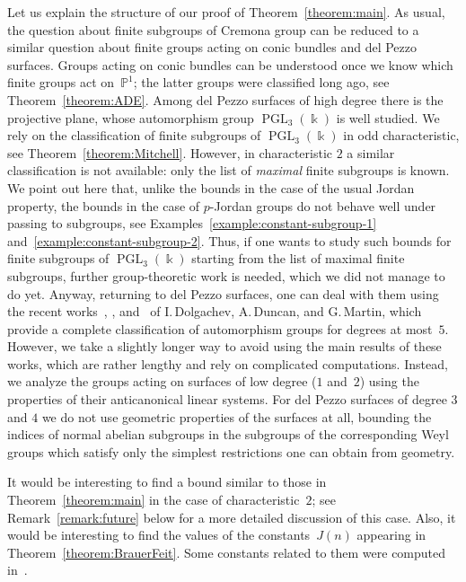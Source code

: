 \documentclass[12pt]{amsart}
\numberwithin{equation}{section}
\theoremstyle{definition}
\newcommand{\PP}{\mathbb P}
\DeclareMathOperator{\PGL}{PGL}
\begin{document}
Let us explain the structure of our proof of Theorem~\ref{theorem:main}.
As usual, the question about finite subgroups of Cremona group
can be reduced to a similar question about finite groups acting
on conic bundles and del Pezzo surfaces. Groups acting on conic bundles
can be understood once we know which finite groups act on~$\PP^1$; the latter
groups were classified long ago, see Theorem~\ref{theorem:ADE}.
Among del Pezzo surfaces of high degree there is the projective plane,
whose automorphism group $\PGL_3(\Bbbk)$ is well studied. We rely on the classification
of finite subgroups of $\PGL_3(\Bbbk)$ in odd characteristic, see Theorem~\ref{theorem:Mitchell}.
However, in characteristic $2$ a similar classification is not available: only the list of \emph{maximal}
finite subgroups is known. We point out here that, unlike the bounds in the case of the usual
Jordan property, the bounds in the case of $p$-Jordan groups do not behave well
under passing to subgroups, see Examples~\ref{example:constant-subgroup-1} and~\ref{example:constant-subgroup-2}. Thus, if one wants to study such bounds
for finite subgroups of $\PGL_3(\Bbbk)$ starting from the list of maximal finite subgroups,
further group-theoretic work is needed, which we did not manage to do yet.
Anyway, returning to del Pezzo surfaces, one can deal with them using the recent
works~\cite{DD}, \cite{DM-odd}, and~\cite{DM-2}
of I.\,Dolgachev, A.\,Duncan, and G.\,Martin, which
provide a complete classification of automorphism groups for degrees at most~$5$.
However, we take a slightly longer way to avoid
using the main results of these works, which are rather lengthy and
rely on complicated computations.
Instead, we analyze the groups acting on
surfaces of low degree ($1$ and~$2$) using the properties of their anticanonical
linear systems. For del Pezzo surfaces
of degree $3$ and $4$ we do not use geometric properties of the surfaces at all,
bounding the indices of normal abelian subgroups in the subgroups of the corresponding
Weyl groups which satisfy only the simplest restrictions one can obtain from geometry.

It would be interesting to find a bound similar to those in Theorem~\ref{theorem:main}
in the case of characteristic~$2$; see Remark~\ref{remark:future} below
for a more detailed discussion of this case.
Also, it would be interesting to find the values of the constants~$J(n)$ appearing in
Theorem~\ref{theorem:BrauerFeit}. Some constants related to them were computed
in~\cite{Collins-modular}.

\smallskip
\end{document}
